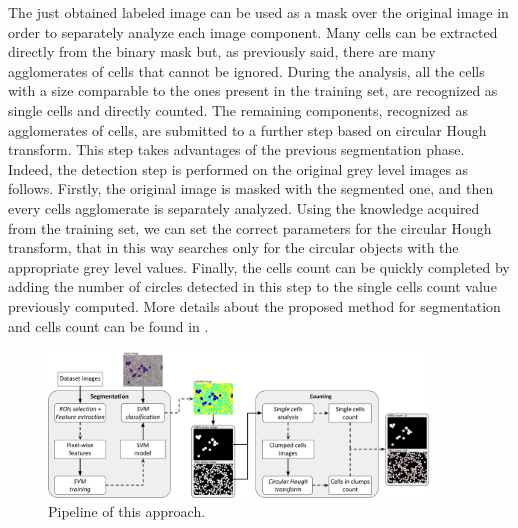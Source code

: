 \documentclass[final,a4paper,12pt,english]{UnicaPhdThesis3}
\begin{document}
{The just obtained labeled image can be used as a mask over the original image in order to separately analyze each image component. Many cells can be extracted directly from the binary mask but, as previously said, there are many agglomerates of cells that cannot be ignored. During the analysis, all the cells with a size comparable to the ones present in the training set, are recognized as single cells and directly counted. The remaining components, recognized as agglomerates of cells, are submitted to a further step based on circular Hough transform. This step takes advantages of the previous segmentation phase. Indeed, the detection step is performed on the original grey level images as follows. Firstly, the original image is masked with the segmented one, and then every cells agglomerate is separately analyzed. Using the knowledge acquired from the training set, we can set the correct parameters for the circular Hough transform, that in this way searches only for the circular objects with the appropriate grey level values. Finally, the cells count can be quickly completed by adding the number of circles detected in this step to the single cells count value previously computed. More details about the proposed method for segmentation and cells count can be found in \cite{DiRuberto2016}.

\begin{figure}[h]
	\centering
	\includegraphics[width=0.90\textwidth]{images/2016_2_sitis/Schema}
	\caption{\label{fig:Schema}Pipeline of this approach.}
\end{figure}

}
\end{document}
